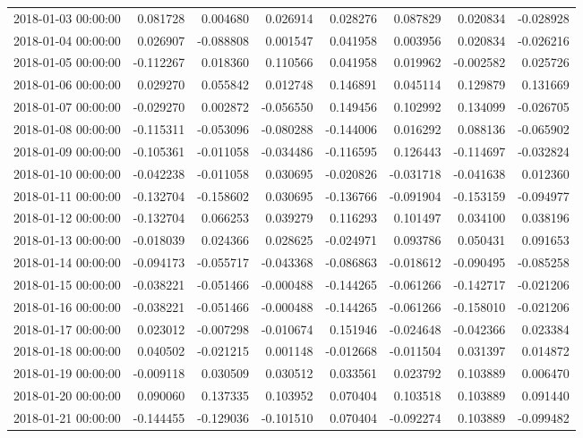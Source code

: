 \begin{tabular}{lrrrrrrr}
2018-01-03 00:00:00 & 0.081728 & 0.004680 & 0.026914 & 0.028276 & 0.087829 & 0.020834 & -0.028928 \\
2018-01-04 00:00:00 & 0.026907 & -0.088808 & 0.001547 & 0.041958 & 0.003956 & 0.020834 & -0.026216 \\
2018-01-05 00:00:00 & -0.112267 & 0.018360 & 0.110566 & 0.041958 & 0.019962 & -0.002582 & 0.025726 \\
2018-01-06 00:00:00 & 0.029270 & 0.055842 & 0.012748 & 0.146891 & 0.045114 & 0.129879 & 0.131669 \\
2018-01-07 00:00:00 & -0.029270 & 0.002872 & -0.056550 & 0.149456 & 0.102992 & 0.134099 & -0.026705 \\
2018-01-08 00:00:00 & -0.115311 & -0.053096 & -0.080288 & -0.144006 & 0.016292 & 0.088136 & -0.065902 \\
2018-01-09 00:00:00 & -0.105361 & -0.011058 & -0.034486 & -0.116595 & 0.126443 & -0.114697 & -0.032824 \\
2018-01-10 00:00:00 & -0.042238 & -0.011058 & 0.030695 & -0.020826 & -0.031718 & -0.041638 & 0.012360 \\
2018-01-11 00:00:00 & -0.132704 & -0.158602 & 0.030695 & -0.136766 & -0.091904 & -0.153159 & -0.094977 \\
2018-01-12 00:00:00 & -0.132704 & 0.066253 & 0.039279 & 0.116293 & 0.101497 & 0.034100 & 0.038196 \\
2018-01-13 00:00:00 & -0.018039 & 0.024366 & 0.028625 & -0.024971 & 0.093786 & 0.050431 & 0.091653 \\
2018-01-14 00:00:00 & -0.094173 & -0.055717 & -0.043368 & -0.086863 & -0.018612 & -0.090495 & -0.085258 \\
2018-01-15 00:00:00 & -0.038221 & -0.051466 & -0.000488 & -0.144265 & -0.061266 & -0.142717 & -0.021206 \\
2018-01-16 00:00:00 & -0.038221 & -0.051466 & -0.000488 & -0.144265 & -0.061266 & -0.158010 & -0.021206 \\
2018-01-17 00:00:00 & 0.023012 & -0.007298 & -0.010674 & 0.151946 & -0.024648 & -0.042366 & 0.023384 \\
2018-01-18 00:00:00 & 0.040502 & -0.021215 & 0.001148 & -0.012668 & -0.011504 & 0.031397 & 0.014872 \\
2018-01-19 00:00:00 & -0.009118 & 0.030509 & 0.030512 & 0.033561 & 0.023792 & 0.103889 & 0.006470 \\
2018-01-20 00:00:00 & 0.090060 & 0.137335 & 0.103952 & 0.070404 & 0.103518 & 0.103889 & 0.091440 \\
2018-01-21 00:00:00 & -0.144455 & -0.129036 & -0.101510 & 0.070404 & -0.092274 & 0.103889 & -0.099482 \\

\end{tabular}
